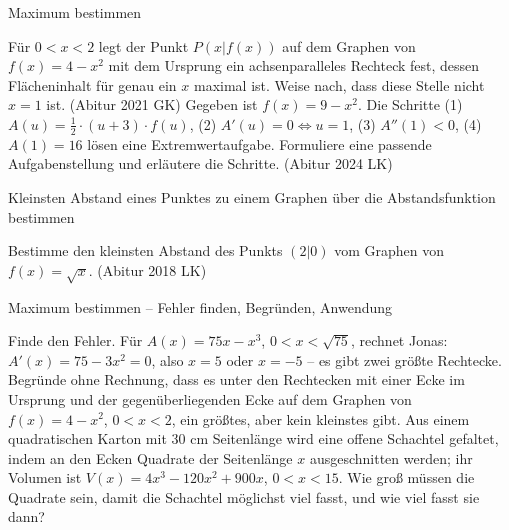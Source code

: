\begin{aufgabe}{Maximum bestimmen}
\begin{teile}
\teil Für $0 < x < 2$ legt der Punkt $P(x | f(x))$ auf dem Graphen von $f(x) = 4 - x^2$ mit dem Ursprung ein achsenparalleles Rechteck fest, dessen Flächeninhalt für genau ein $x$ maximal ist. Weise nach, dass diese Stelle nicht $x = 1$ ist. \hfill (Abitur 2021 GK)
\teil Gegeben ist $f(x) = 9 - x^2$. Die Schritte (1) $A(u) = \tfrac{1}{2} \cdot (u + 3) \cdot f(u)$, (2) $A'(u) = 0 \Leftrightarrow u = 1$, (3) $A''(1) < 0$, (4) $A(1) = 16$ lösen eine Extremwertaufgabe. Formuliere eine passende Aufgabenstellung und erläutere die Schritte. \hfill (Abitur 2024 LK)
\end{teile}
\end{aufgabe}

\begin{aufgabe}{Kleinsten Abstand eines Punktes zu einem Graphen über die Abstandsfunktion bestimmen}
\begin{teile}
\teil Bestimme den kleinsten Abstand des Punkts $(2 | 0)$ vom Graphen von $f(x) = \sqrt{x}$. \hfill (Abitur 2018 LK)
\end{teile}
\end{aufgabe}

\begin{aufgabe}{Maximum bestimmen – Fehler finden, Begründen, Anwendung}
\begin{teile}
\teil Finde den Fehler. Für $A(x) = 75x - x^3$, $0 < x < \sqrt{75}$, rechnet Jonas: $A'(x) = 75 - 3x^2 = 0$, also $x = 5$ oder $x = -5$ – es gibt zwei größte Rechtecke.
\teil Begründe ohne Rechnung, dass es unter den Rechtecken mit einer Ecke im Ursprung und der gegenüberliegenden Ecke auf dem Graphen von $f(x) = 4 - x^2$, $0 < x < 2$, ein größtes, aber kein kleinstes gibt.
\teil Aus einem quadratischen Karton mit 30 cm Seitenlänge wird eine offene Schachtel gefaltet, indem an den Ecken Quadrate der Seitenlänge $x$ ausgeschnitten werden; ihr Volumen ist $V(x) = 4x^3 - 120x^2 + 900x$, $0 < x < 15$. Wie groß müssen die Quadrate sein, damit die Schachtel möglichst viel fasst, und wie viel fasst sie dann?
\end{teile}
\end{aufgabe}
